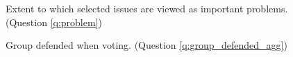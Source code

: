 
\begin{figure}[h!]
    \caption{Extent to which selected issues are viewed as important problems. (Question \ref{q:problem})}\label{fig:problem}
\end{figure}

\begin{figure}[h!]
    \caption{Group defended when voting. (Question \ref{q:group_defended_agg})}\label{fig:group_defended_agg}
\end{figure}


